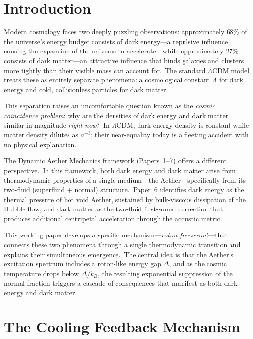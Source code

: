 \documentclass[12pt,letterpaper]{article}
\begin{document}
\section{Introduction}

Modern cosmology faces two deeply puzzling observations: approximately 68\%
of the universe's energy budget consists of dark energy---a repulsive
influence causing the expansion of the universe to accelerate---while
approximately 27\% consists of dark matter---an attractive influence that
binds galaxies and clusters more tightly than their visible mass can
account for.\ The standard $\Lambda$CDM model treats these as entirely
separate phenomena: a cosmological constant $\Lambda$ for dark energy and
cold, collisionless particles for dark matter.

This separation raises an uncomfortable question known as the \emph{cosmic
coincidence problem}: why are the densities of dark energy and dark matter
similar in magnitude \emph{right now}?\ In $\Lambda$CDM, dark energy density
is constant while matter density dilutes as $a^{-3}$; their near-equality
today is a fleeting accident with no physical explanation.

The Dynamic Aether Mechanics framework (Papers~1--7) offers a different
perspective.\ In this framework, both dark energy and dark matter arise from
thermodynamic properties of a single medium---the Aether---specifically from
its two-fluid (superfluid + normal) structure.\ Paper~6 identifies dark energy
as the thermal pressure of hot void Aether, sustained by bulk-viscous
dissipation of the Hubble flow, and dark matter as the two-fluid first-sound
correction that produces additional centripetal acceleration through the
acoustic metric.

This working paper develops a specific mechanism---\emph{roton freeze-out}---that
connects these two phenomena through a single thermodynamic transition and
explains their simultaneous emergence.\ The central idea is that the Aether's
excitation spectrum includes a roton-like energy gap $\Delta$, and as the
cosmic temperature drops below $\Delta/k_B$, the resulting exponential
suppression of the normal fraction triggers a cascade of consequences that
manifest as both dark energy and dark matter.


\section{The Cooling Feedback Mechanism}
\label{sec:cooling}
\end{document}
